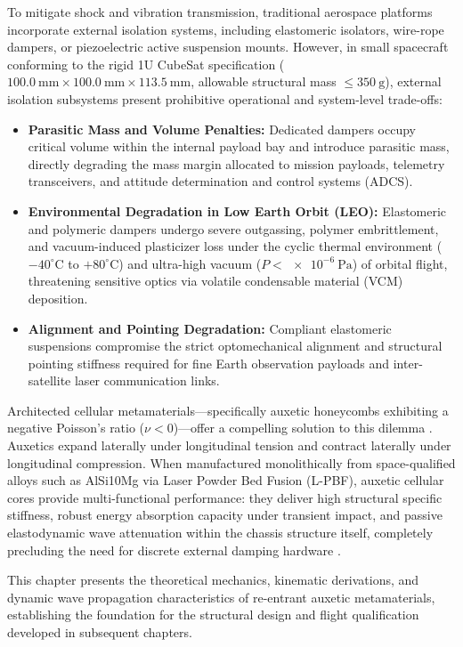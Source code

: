 To mitigate shock and vibration transmission, traditional aerospace platforms incorporate external isolation systems, including elastomeric isolators, wire-rope dampers, or piezoelectric active suspension mounts. However, in small spacecraft conforming to the rigid 1U CubeSat specification ($\SI{100.0}{\milli\meter} \times \SI{100.0}{\milli\meter} \times \SI{113.5}{\milli\meter}$, allowable structural mass $\le \SI{350}{\gram}$), external isolation subsystems present prohibitive operational and system-level trade-offs:
\begin{itemize}
\item \textbf{Parasitic Mass and Volume Penalties:} Dedicated dampers occupy critical volume within the internal payload bay and introduce parasitic mass, directly degrading the mass margin allocated to mission payloads, telemetry transceivers, and attitude determination and control systems (ADCS).
\item \textbf{Environmental Degradation in Low Earth Orbit (LEO):} Elastomeric and polymeric dampers undergo severe outgassing, polymer embrittlement, and vacuum-induced plasticizer loss under the cyclic thermal environment ($-40^\circ\text{C}$ to $+80^\circ\text{C}$) and ultra-high vacuum ($P < \SI{e-6}{\pascal}$) of orbital flight, threatening sensitive optics via volatile condensable material (VCM) deposition.
\item \textbf{Alignment and Pointing Degradation:} Compliant elastomeric suspensions compromise the strict optomechanical alignment and structural pointing stiffness required for fine Earth observation payloads and inter-satellite laser communication links.
\end{itemize}

Architected cellular metamaterials—specifically auxetic honeycombs exhibiting a negative Poisson's ratio ($\nu < 0$)—offer a compelling solution to this dilemma \cite{lakes1987,gibson1997}. Auxetics expand laterally under longitudinal tension and contract laterally under longitudinal compression. When manufactured monolithically from space-qualified alloys such as AlSi10Mg via Laser Powder Bed Fusion (L-PBF), auxetic cellular cores provide multi-functional performance: they deliver high structural specific stiffness, robust energy absorption capacity under transient impact, and passive elastodynamic wave attenuation within the chassis structure itself, completely precluding the need for discrete external damping hardware \cite{alomarah2017,collini2024}.

This chapter presents the theoretical mechanics, kinematic derivations, and dynamic wave propagation characteristics of re-entrant auxetic metamaterials, establishing the foundation for the structural design and flight qualification developed in subsequent chapters.

